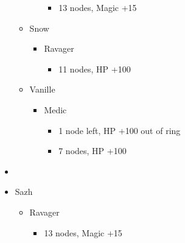 \begin{paracol}{2}
\begin{menu}
\begin{itemize}
\begin{itemize}
\begin{itemize}
\begin{itemize}
						            \item 13 nodes, Magic +15
					            \end{itemize}
				      \end{itemize}
				\item Snow
				      \begin{itemize}
					      \item Ravager
					            \begin{itemize}
						            \item 11 nodes, HP +100
					            \end{itemize}
				      \end{itemize}
				\item Vanille
				      \begin{itemize}
					      \item Medic
					            \begin{itemize}
						            \item 1 node left, HP +100 out of ring
						            \item 7 nodes, HP +100
					            \end{itemize}
				      \end{itemize}
			\end{itemize}
		\end{itemize}
	\end{menu}
	\switchcolumn
	\begin{menu}
		\begin{itemize}
			\paradigm
			\begin{itemize}
				\item {}%
				      {\paradigmline{(\com)}{(\com)}{(\med)}}%
				      {\paradigmline{(\rav)}{\rav}{\rav}}%
				      {\paradigmline[3]{\textit{\rav}}{\textit{(\rav)}}{\textit{(\sab)}}}%
				      {\paradigmline{\com}{\com}{\rav}}%
				      {\paradigmline{(\syn)}{(\rav)}{\sab}}%
				      {\paradigmline{\com}{\com}{\rav}}
			\end{itemize}
			\crystarium
			\begin{itemize}
				\item Sazh
				      \begin{itemize}
					      \item Ravager
					            \begin{itemize}
						            \item 13 nodes, Magic +15
					            \end{itemize}

\end{itemize}
\end{itemize}
\end{itemize}
\end{menu}
\end{paracol}
